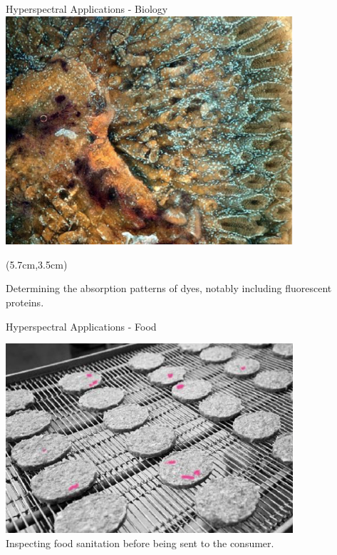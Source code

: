 \documentclass{beamer}
\begin{document}
\begin{frame}{Hyperspectral Applications - Biology}
   \includegraphics[width=0.8\textwidth]{figures/colon.png}
   \begin{textblock*}{\textwidth}(5.7cm,3.5cm) %
      \begin{center}
         \color{red}{MUSE \\(Microscopy \\with UV Surface \\Enhancement) \\image of colon}
      \end{center}
   \end{textblock*}
   \begin{center}
      Determining the absorption patterns of dyes, notably including fluorescent proteins.
   \end{center}
\end{frame}

\begin{frame}{Hyperspectral Applications - Food}
   \begin{center}
      \includegraphics[width=0.8\textwidth]{figures/hamburger.png}
      \\Inspecting food sanitation before being sent to the consumer.
   \end{center}
\end{frame}
\end{document}
